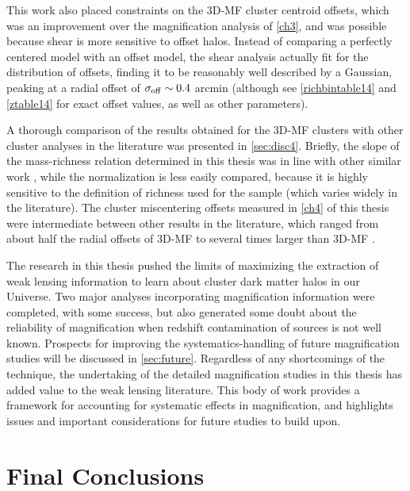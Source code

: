 This work also placed constraints on the \ac{3D-MF} cluster centroid offsets, which was an improvement over the magnification analysis of \autoref{ch3}, and was possible because shear is more sensitive to offset halos. Instead of comparing a perfectly centered model with an offset model, the shear analysis actually fit for the distribution of offsets, finding it to be reasonably well described by a Gaussian, peaking at a radial offset of $\sigma_{\rm off} \sim 0.4$ arcmin (although see \autoref{richbintable14} and \autoref{ztable14} for exact offset values, as well as other parameters). 

A thorough comparison of the results obtained for the \ac{3D-MF} clusters with other cluster analyses in the literature was presented in \autoref{sec:disc4}. Briefly, the slope of the mass-richness relation determined in this thesis was in line with other similar work \citep{Wen12,Covone14}, while the normalization is less easily compared, because it is highly sensitive to the definition of richness used for the sample (which varies widely in the literature). The cluster miscentering offsets measured in \autoref{ch4} of this thesis were intermediate between other results in the literature, which ranged from about half the radial offsets of \ac{3D-MF} \citep{George12} to several times larger than \ac{3D-MF} \citep{Johnston07}.

The research in this thesis pushed the limits of maximizing the extraction of weak lensing information to learn about cluster dark matter halos in our Universe. Two major analyses incorporating magnification information were completed, with some success, but also generated some doubt about the reliability of magnification when redshift contamination of sources is not well known. Prospects for improving the systematics-handling of future magnification studies will be discussed in \autoref{sec:future}. Regardless of any shortcomings of the technique, the undertaking of the detailed magnification studies in this thesis has added value to the weak lensing literature. This body of work provides a framework for accounting for systematic effects in magnification, and highlights issues and important considerations for future studies to build upon.


\section{Final Conclusions}
\label{sec:conc}

